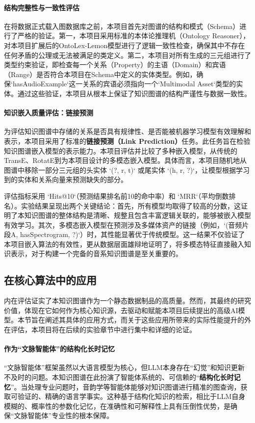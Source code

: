 \paragraph{结构完整性与一致性评估}
在将数据正式载入图数据库之前，本项目首先对图谱的结构和模式（Schema）进行了严格的验证。第一，本项目采用标准的本体论推理机（Ontology Reasoner），对本项目扩展后的OntoLex-Lemon模型进行了逻辑一致性检查，确保其中不存在任何矛盾的公理或无法被满足的类定义。第二，本项目对所有生成的三元组进行了类型约束验证，即检查每一个关系（Property）的主语（Domain）和宾语（Range）是否符合本项目在Schema中定义的实体类型。例如，确保`hasAudioExample`这一关系的宾语必须指向一个`Multimodal Asset`类型的实体。通过这些验证，本项目从根本上保证了知识图谱的结构严谨性与数据一致性。

\paragraph{知识嵌入质量评估：链接预测}
为评估知识图谱中存储的关系是否具有规律性、是否能被机器学习模型有效理解和表示，本项目采用了标准的\textbf{链接预测（Link Prediction）}任务。此任务旨在检验知识图谱嵌入模型的表示能力。本项目评估并比较了多种嵌入模型，从传统的TransE、RotatE到为本项目设计的多模态嵌入模型。具体而言，本项目随机地从图谱中移除一部分三元组的头实体 `(?, r, t)` 或尾实体 `(h, r, ?)`，让模型根据学习到的实体和关系向量来预测缺失的部分。

评估指标采用 `Hits@10`（预测结果排名前10的命中率）和 `MRR`（平均倒数排名）。实验结果呈现出两个关键结论：首先，所有模型均取得了较高的分数，这证明了本知识图谱的整体结构是清晰、规整且包含丰富逻辑关联的，能够被嵌入模型有效学习。其次，多模态嵌入模型在预测涉及多媒体资产的链接（例如，`(音频片段A, hasSpectrogram, ?)`）时，其性能显著优于传统模型。这一结果不仅验证了本项目嵌入算法的有效性，更从数据层面雄辩地证明了，将多模态特征直接融入知识表示，对于构建一个完备的音系知识图谱是至关重要的。

\subsection{在核心算法中的应用}
内在评估证实了本知识图谱作为一个静态数据制品的高质量。然而，其最终的研究价值，体现在它如何作为核心知识源，去驱动和赋能本项目后续提出的高级AI模型。本节旨在阐述其具体的应用方式，而关于这些应用所带来的实际性能提升的外在评估，本项目将在后续的实验章节中进行集中和详细的论证。

\paragraph{作为“文脉智能体”的结构化长时记忆}
“文脉智能体”框架虽然以大语言模型为核心，但LLM本身存在“幻觉”和知识更新不及时的问题。本知识图谱在此扮演了智能体系统的、可信赖的“\textbf{结构化长时记忆}”。当处理专业问题时，音韵学等智能体能够对知识图谱进行精准的图查询，获取可验证的、精确的语言学事实。这种基于结构化知识的检索，相比于LLM自身模糊的、概率性的参数化记忆，在准确性和可解释性上具有压倒性优势，是确保“文脉智能体”专业性的根本保障。

